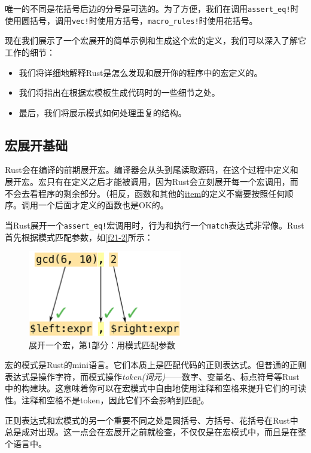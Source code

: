 唯一的不同是花括号后边的分号是可选的。为了方便，我们在调用\texttt{assert\_eq!}时使用圆括号，调用\texttt{vec!}时使用方括号，\texttt{macro\_rules!}时使用花括号。

现在我们展示了一个宏展开的简单示例和生成这个宏的定义，我们可以深入了解它工作的细节：
\begin{itemize}
    \item 我们将详细地解释Rust是怎么发现和展开你的程序中的宏定义的。
    \item 我们将指出在根据宏模板生成代码时的一些细节之处。
    \item 最后，我们将展示模式如何处理重复的结构。
\end{itemize}

\subsection{宏展开基础}
Rust会在编译的前期展开宏。编译器会从头到尾读取源码，在这个过程中定义和展开宏。宏只有在定义之后才能被调用，因为Rust会立刻展开每一个宏调用，而不会去看程序的剩余部分。（相反，函数和其他的\hyperref[static]{item}的定义不需要按照任何顺序。调用一个后面才定义的函数也是OK的。

当Rust展开一个\texttt{assert\_eq!}宏调用时，行为和执行一个\texttt{match}表达式非常像。Rust首先根据模式匹配参数，如\autoref{f21-2}所示：
\begin{figure}[htbp]
    \centering
    \includegraphics[width=0.6\textwidth]{../img/f21-2.png}
    \caption{展开一个宏，第1部分：用模式匹配参数}
    \label{f21-2}
\end{figure}

宏的模式是Rust的mini语言。它们本质上是匹配代码的正则表达式。但普通的正则表达式是操作字符，而模式操作\emph{token(词元)}——数字、变量名、标点符号等Rust中的构建块。这意味着你可以在宏模式中自由地使用注释和空格来提升它们的可读性。注释和空格不是token，因此它们不会影响到匹配。

正则表达式和宏模式的另一个重要不同之处是圆括号、方括号、花括号在Rust中总是成对出现。这一点会在宏展开之前就检查，不仅仅是在宏模式中，而且是在整个语言中。


